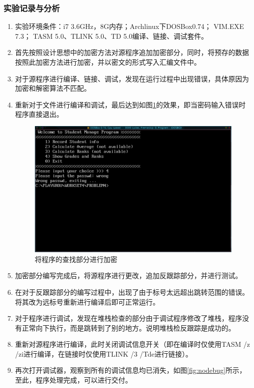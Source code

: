 \documentclass{article}
\begin{document}
	\subsubsection{实验记录与分析}
	\begin{enumerate}
		\item 实验环境条件：i7 3.6GHz，8G内存；Archlinux下DOSBox0.74； VIM.EXE 7.3； TASM 5.0、TLINK 5.0、TD 5.0编译、链接、调试套件。
		\item 首先按照设计思想中的加密方法对源程序追加加密部分，同时，将预存的数据按照此加密方法进行加密，并以密文的形式写入汇编文件中。
		\item 对于源程序进行编译、链接、调试，发现在运行过程中出现错误，具体原因为加密和解密算法不匹配。
		\item 重新对于文件进行编译和调试，最后达到如图\ref{fig:passwd}的效果，即当密码输入错误时程序直接退出。
			\begin{figure}[H]
				\centering
				\includegraphics[width=0.85\linewidth]{res/homework_4/passwd.png}
				\caption{将程序的查找部分进行加密}
				\label{fig:passwd}
			\end{figure}
		\item 加密部分编写完成后，将源程序进行更改，追加反跟踪部分，并进行测试。
		\item 在对于反跟踪部分的编写过程中，出现了由于标号太远超出跳转范围的错误。将其改为远标号重新进行编译后即可正常运行。
		\item 对于程序进行调试，发现在堆栈检查的部分由于调试程序修改了堆栈，程序没有正常向下执行，而是跳转到了别的地方。说明堆栈检反跟踪是成功的。
		\item 重新对源程序进行编译，此时关闭调试信息开关（即在编译时仅使用TASM /z /zi进行编译，在链接时仅使用TLINK /3 /Tde进行链接）。
		\item 再次打开调试器，观察到所有的调试信息均已消失，如图\ref{fig:nodebug}所示，至此，程序处理完成，可以进行交付。

\end{enumerate}
\end{document}
